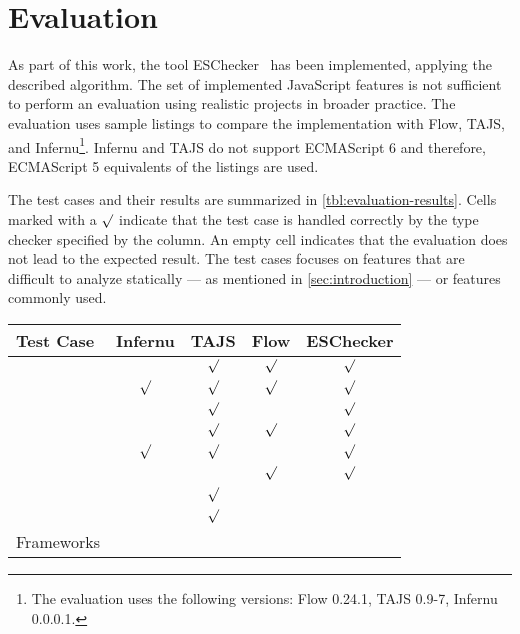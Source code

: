 \section{Evaluation}\label{sec:evaluation}
As part of this work, the tool ESChecker~\cite{Reiser2016} has been implemented, applying the described algorithm. The set of implemented JavaScript features is not sufficient to perform an evaluation using realistic projects in broader practice. The evaluation uses sample listings to compare the implementation with Flow, TAJS, and Infernu\footnote{The evaluation uses the following versions: Flow 0.24.1, TAJS 0.9-7, Infernu 0.0.0.1.}. Infernu and TAJS do not support ECMAScript 6 and therefore, ECMAScript 5 equivalents of the listings are used. 

The test cases and their results are summarized in \cref{tbl:evaluation-results}. Cells marked with a $\surd$ indicate that the test case is handled correctly by the type checker specified by the column. An empty cell indicates that the evaluation does not lead to the expected result. The test cases focuses on features that are difficult to analyze statically --- as mentioned in \cref{sec:introduction} --- or features commonly used.


\begin{table*}
	\centering
	\begin{tabular}{@{}l c c c c@{}}\toprule
	Test Case & Infernu & TAJS & Flow & ESChecker \\ \midrule
	\nameref{ssec:variable-redefinement} &  & $\surd$ & $\surd$ & $\surd$ \\
	\nameref{ssec:closures} & $\surd$ & $\surd$ & $\surd$ & $\surd$ \\
	\nameref{ssec:side-effects} & & $\surd$ & & $\surd$ \\ 
	\nameref{ssec:function-overloading} & & $\surd$ & $\surd$ & $\surd$ \\ 
	\nameref{ssec:callbacks} & $\surd$ & $\surd$ &  & $\surd$ \\ 
	\nameref{ssec:built-in-types} & & & $\surd$ & $\surd$ \\ 
	\nameref{ssec:dynamic-object-manipulation} & & $\surd$ & & \\ 
	\nameref{ssec:dom-events} & & $\surd$ & & \\ 
	Frameworks & & & & \\ \bottomrule
	\end{tabular}
	\caption{Evaluation Results}
	\label{tbl:evaluation-results}
\end{table*}

